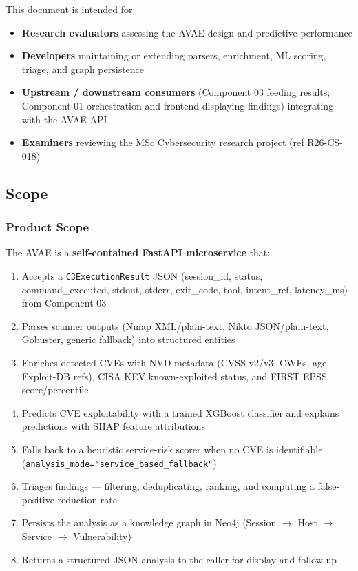 \documentclass[10pt,journal,onecolumn]{IEEEtran}
\begin{document}
This document is intended for:

\begin{itemize}
\item \textbf{Research evaluators} assessing the AVAE design and predictive performance
\item \textbf{Developers} maintaining or extending parsers, enrichment, ML scoring, triage, and graph persistence
\item \textbf{Upstream / downstream consumers} (Component 03 feeding results; Component 01 orchestration and frontend displaying findings) integrating with the AVAE API
\item \textbf{Examiners} reviewing the MSc Cybersecurity research project (ref R26-CS-018)
\end{itemize}

\subsection{Scope}

\subsubsection{Product Scope}

The AVAE is a \textbf{self-contained FastAPI microservice} that:

\begin{enumerate}
\item Accepts a \texttt{C3ExecutionResult} JSON (session\_id, status, command\_executed, stdout, stderr, exit\_code, tool, intent\_ref, latency\_ms) from Component 03
\item Parses scanner outputs (Nmap XML/plain-text, Nikto JSON/plain-text, Gobuster, generic fallback) into structured entities
\item Enriches detected CVEs with NVD metadata (CVSS v2/v3, CWEs, age, Exploit-DB refs), CISA KEV known-exploited status, and FIRST EPSS score/percentile
\item Predicts CVE exploitability with a trained XGBoost classifier and explains predictions with SHAP feature attributions
\item Falls back to a heuristic service-risk scorer when no CVE is identifiable (\texttt{analysis\_\allowbreak mode="service\_\allowbreak based\_\allowbreak fallback"})
\item Triages findings --- filtering, deduplicating, ranking, and computing a false-positive reduction rate
\item Persists the analysis as a knowledge graph in Neo4j (Session $\rightarrow$ Host $\rightarrow$ Service $\rightarrow$ Vulnerability)
\item Returns a structured JSON analysis to the caller for display and follow-up
\end{enumerate}
\end{document}
